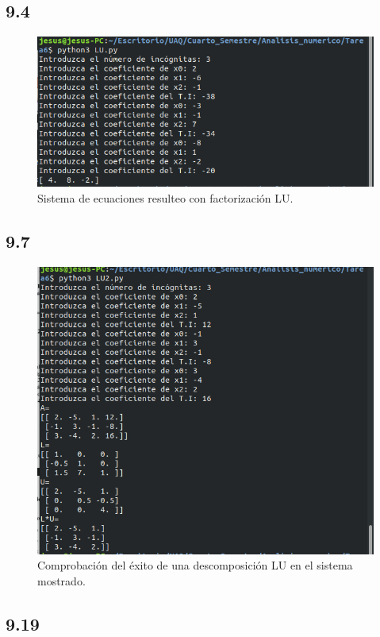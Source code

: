 \documentclass[12pt,oneside,FLEQN]{report}
\begin{document}
{	\subsection{9.4}
		
		\begin{figure}[!h]
			\centering
			\includegraphics[scale=0.5]{104.png}
			\caption{Sistema de ecuaciones resulteo con factorización LU.}
		\end{figure}
	\subsection{9.7}
		
		\begin{figure}[!h]
			\centering
			\includegraphics[scale=0.5]{107.png}
			\caption{Comprobación del éxito de una descomposición LU en el sistema mostrado.}
		\end{figure}
	\subsection{9.19}
}
\end{document}
